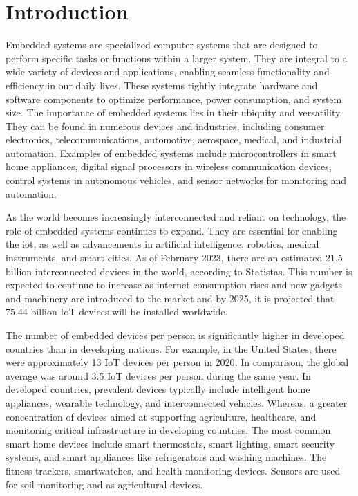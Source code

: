 
\chapter{Introduction}

Embedded systems are specialized computer systems that are designed to perform specific tasks or
functions within a larger system. They are integral to a wide variety of devices and applications,
enabling seamless functionality and efficiency in our daily lives. These systems tightly integrate
hardware and software components to optimize performance, power consumption, and system size.
The importance of embedded systems lies in their ubiquity and versatility. They can be found in
numerous devices and industries, including consumer electronics, telecommunications, automotive,
aerospace, medical, and industrial automation. Examples of embedded systems include microcontrollers
in smart home appliances, digital signal processors in wireless communication devices, control systems
in autonomous vehicles, and sensor networks for monitoring and automation\cite{marwedel2021embedded}.

As the world becomes increasingly interconnected and reliant on technology, the role of embedded
systems continues to expand. They are essential for enabling the \acrlong{iot}, as well as
advancements in artificial intelligence, robotics, medical instruments, and
smart cities\cite{camposano1996embedded:ARTICLE}. As of February 2023, there are an estimated
21.5 billion interconnected devices in the world, according to
Statistas\cite{IoTconne16:online}\cite{HowManyI1:online}.
This number is expected to continue to increase as internet consumption rises and
new gadgets and machinery are introduced to the market and by 2025,
it is projected that 75.44 billion IoT devices will be installed worldwide\cite{HowManyI1:online}.

The number of embedded devices per person is significantly higher in developed
countries than in developing nations. For example, in the United States, there
were approximately 13 IoT devices per person in 2020\cite{Stateoft48:online}.
In comparison, the global average was around 3.5 IoT devices per person during
the same year\cite{CiscoAnn1:online}. In developed countries, prevalent devices
typically include intelligent home appliances, wearable technology, and interconnected vehicles.
Whereas, a greater concentration of devices aimed at supporting agriculture, healthcare, and monitoring
critical infrastructure in developing countries. The most common smart home devices include smart
thermostats, smart lighting, smart security systems, and smart appliances like refrigerators and washing machines.
The fitness trackers, smartwatches, and health monitoring devices. Sensors are used for soil
monitoring and as agricultural devices.

